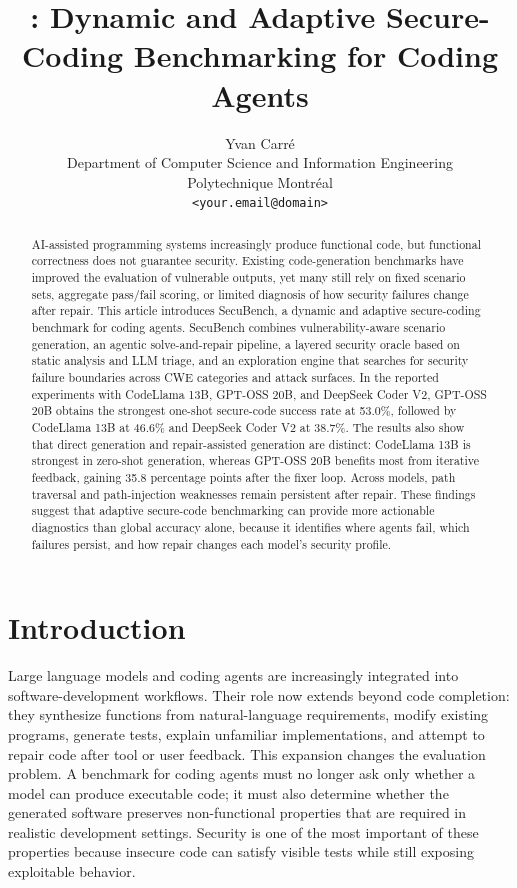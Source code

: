 \documentclass[11pt]{article}
\title{\toolname: Dynamic and Adaptive Secure-Coding Benchmarking for Coding Agents}
\author{
Yvan Carré\\
Department of Computer Science and Information Engineering\\
Polytechnique Montréal\\
\texttt{<your.email@domain>}
}
\date{}
\newcommand{\toolname}{SecuBench}
\newcommand{\pp}{percentage points}
\begin{document}
\maketitle


\begin{abstract}
AI-assisted programming systems increasingly produce functional code, but functional correctness does not guarantee security. Existing code-generation benchmarks have improved the evaluation of vulnerable outputs, yet many still rely on fixed scenario sets, aggregate pass/fail scoring, or limited diagnosis of how security failures change after repair. This article introduces \toolname{}, a dynamic and adaptive secure-coding benchmark for coding agents. \toolname{} combines vulnerability-aware scenario generation, an agentic solve-and-repair pipeline, a layered security oracle based on static analysis and LLM triage, and an exploration engine that searches for security failure boundaries across CWE categories and attack surfaces. In the reported experiments with CodeLlama 13B, GPT-OSS 20B, and DeepSeek Coder V2, GPT-OSS 20B obtains the strongest one-shot secure-code success rate at 53.0\%, followed by CodeLlama 13B at 46.6\% and DeepSeek Coder V2 at 38.7\%. The results also show that direct generation and repair-assisted generation are distinct: CodeLlama 13B is strongest in zero-shot generation, whereas GPT-OSS 20B benefits most from iterative feedback, gaining 35.8 \pp{} after the fixer loop. Across models, path traversal and path-injection weaknesses remain persistent after repair. These findings suggest that adaptive secure-code benchmarking can provide more actionable diagnostics than global accuracy alone, because it identifies where agents fail, which failures persist, and how repair changes each model's security profile.
\end{abstract}


\section{Introduction}

Large language models and coding agents are increasingly integrated into software-development workflows. Their role now extends beyond code completion: they synthesize functions from natural-language requirements, modify existing programs, generate tests, explain unfamiliar implementations, and attempt to repair code after tool or user feedback. This expansion changes the evaluation problem. A benchmark for coding agents must no longer ask only whether a model can produce executable code; it must also determine whether the generated software preserves non-functional properties that are required in realistic development settings. Security is one of the most important of these properties because insecure code can satisfy visible tests while still exposing exploitable behavior.
\end{document}
